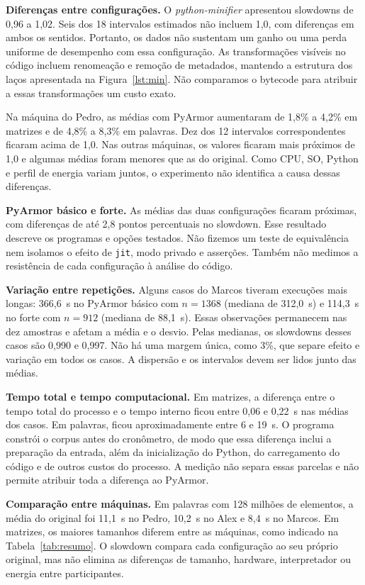 \documentclass[12pt]{article}
\begin{document}
\textbf{Diferenças entre configurações.} O \emph{python-minifier} apresentou slowdowns de 0,96 a 1,02.
Seis dos 18 intervalos estimados não incluem 1,0, com diferenças em ambos os sentidos. Portanto, os dados
não sustentam um ganho ou uma perda uniforme de desempenho com essa configuração. As transformações
visíveis no código incluem renomeação e remoção de metadados, mantendo a estrutura dos laços apresentada
na Figura~\ref{lst:min}. Não comparamos o bytecode para atribuir a essas transformações um custo exato.

Na máquina do Pedro, as médias com PyArmor aumentaram de 1,8\% a 4,2\% em matrizes e de 4,8\% a 8,3\% em
palavras. Dez dos 12 intervalos correspondentes ficaram acima de 1,0. Nas outras máquinas, os valores
ficaram mais próximos de 1,0 e algumas médias foram menores que as do original. Como CPU, SO, Python e
perfil de energia variam juntos, o experimento não identifica a causa dessas diferenças.

\textbf{PyArmor básico e forte.} As médias das duas configurações ficaram próximas, com diferenças de
até 2,8 pontos percentuais no slowdown. Esse resultado descreve os programas e opções testados. Não fizemos
um teste de equivalência nem isolamos o efeito de \texttt{jit}, modo privado e asserções. Também não
medimos a resistência de cada configuração à análise do código.

\textbf{Variação entre repetições.} Alguns casos do Marcos tiveram execuções mais longas: 366,6~s no
PyArmor básico com $n=1368$ (mediana de 312,0~s) e 114,3~s no forte com $n=912$ (mediana de 88,1~s).
Essas observações permanecem nas dez amostras e afetam a média e o desvio. Pelas medianas, os slowdowns
desses casos são 0,990 e 0,997. Não há uma margem única, como 3\%, que separe efeito e variação em todos
os casos. A dispersão e os intervalos devem ser lidos junto das médias.

\textbf{Tempo total e tempo computacional.} Em matrizes, a diferença entre o tempo total do processo e
o tempo interno ficou entre 0,06 e 0,22~s nas médias dos casos. Em palavras, ficou aproximadamente entre
6 e 19~s. O programa constrói o corpus antes do cronômetro, de modo que essa diferença inclui a preparação
da entrada, além da inicialização do Python, do carregamento do código e de outros custos do processo.
A medição não separa essas parcelas e não permite atribuir toda a diferença ao PyArmor.

\textbf{Comparação entre máquinas.} Em palavras com 128 milhões de elementos, a média do original foi
11,1~s no Pedro, 10,2~s no Alex e 8,4~s no Marcos. Em matrizes, os maiores tamanhos diferem entre as máquinas,
como indicado na Tabela~\ref{tab:resumo}. O slowdown compara cada configuração ao seu próprio original,
mas não elimina as diferenças de tamanho, hardware, interpretador ou energia entre participantes.
\end{document}
